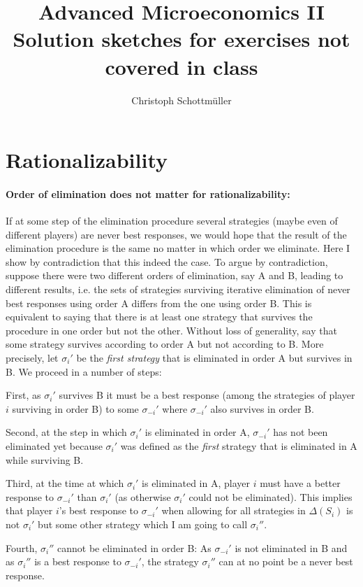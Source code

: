 \documentclass[a4paper,11pt]{article}
\title{Advanced Microeconomics II\\ Solution sketches for exercises not covered in class}
\author{Christoph Schottmüller}
\begin{document}
\maketitle


\section{Rationalizability}
\label{sec:rationalizability}

\paragraph{Order of elimination does not matter for rationalizability:} If at some step of the elimination procedure several strategies (maybe even of different players) are never best responses, we would hope that the result of the elimination procedure is the same no matter in which order we eliminate. Here I show by contradiction that this indeed the case. To argue by contradiction, suppose there were two different orders of elimination, say A and B, leading to different results, i.e. the sets of strategies surviving iterative elimination of never best responses using order A differs from the one using order B. This is equivalent to saying that there is at least one strategy that survives the procedure in one order but not the other. Without loss of generality, say that some strategy survives according to order A but not according to B. More precisely, let $\sigma_i'$ be the \emph{first strategy} that is eliminated in order A but survives in B.  We proceed in a number of steps:

First, as $\sigma_i'$ survives B it must be a best response (among the strategies of player $i$ surviving in order B) to some $\sigma_{-i}'$ where $\sigma_{-i}'$ also survives in order B.

Second, at the step in which $\sigma_i'$ is eliminated in order A, $\sigma_{-i}'$ has not been eliminated yet because $\sigma_i'$ was defined as the \emph{first} strategy that is eliminated in A while surviving B.

Third, at the time at which $\sigma_i'$ is eliminated in A, player $i$ must have a better response to $\sigma_{-i}'$ than $\sigma_i'$ (as otherwise $\sigma_i'$ could not be eliminated). This implies that player $i$'s best response to $\sigma_{-i}'$ when allowing for all strategies in $\Delta(S_i)$ is not $\sigma_i'$ but some other strategy which I am going to call $\sigma_i''$.

Fourth, $\sigma_i''$ cannot be eliminated in order B: As $\sigma_{-i}'$ is not eliminated in B and as $\sigma_i''$ is a best response to $\sigma_{-i}'$, the strategy $\sigma_i''$ can at no point be a never best response.
\end{document}
